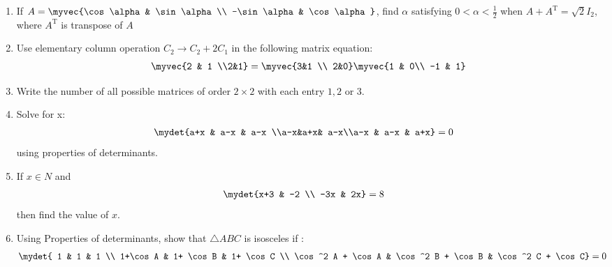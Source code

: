 \begin{enumerate}[label=\thesubsection.\arabic*, ref=\thesubsection.\theenumi]
    \item If $A = \myvec{\cos \alpha & \sin \alpha\\ -\sin \alpha & \cos \alpha}$, find $\alpha$ satisfying $0<\alpha<\frac{1}{2}$ when $A + A^{\text{T}} = \sqrt{2}I_{2}$, where $A^{\text{T}}$ is transpose of $A$
    \item Use elementary column operation $C_2 \rightarrow C_2 + 2C_1$ in the following matrix equation:
          \begin{align*}
              \myvec{2 & 1 \\2&1} = \myvec{3&1 \\ 2&0} \myvec{1 & 0\\ -1 & 1}
          \end{align*}
    \item Write the number of all possible matrices of order $2\times2$ with each entry $1,2$ or $3$.
    \item Solve for x:
          \begin{align*}
              \mydet{a+x & a-x & a-x \\a-x&a+x& a-x\\a-x & a-x & a+x} &=0
          \end{align*}
          using properties of determinants.
    \item If $x \in N$ and
          \begin{align*}
              \mydet{x+3 & -2 \\ -3x & 2x} &= 8
          \end{align*}
          then find the value of $x$.
    \item Using Properties of determinants, show that $\triangle ABC$ is isosceles if :
          \begin{align*}
              \mydet{
              1                 & 1                 & 1                       \\
              1+\cos A          & 1+ \cos B         & 1+ \cos C               \\
              \cos^2 A + \cos A & \cos^2 B + \cos B & \cos^2 C + \cos C} & =0
          \end{align*}
\end{enumerate}
